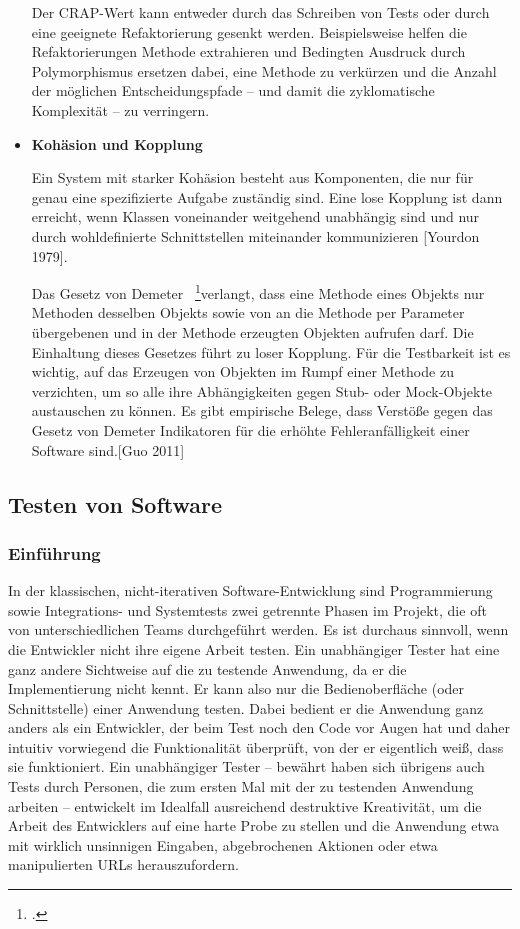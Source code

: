 \begin{itemize}
    Der CRAP-Wert kann entweder durch das Schreiben von Tests oder durch eine geeignete Refaktorierung 
    gesenkt werden. Beispielsweise helfen die Refaktorierungen Methode extrahieren und Bedingten Ausdruck 
    durch Polymorphismus ersetzen dabei, eine Methode zu verkürzen und die Anzahl der möglichen 
    Entscheidungspfade – und damit die zyklomatische Komplexität – zu verringern.
    
    \item \textbf{Kohäsion und Kopplung}
    
    Ein System mit starker Kohäsion besteht aus Komponenten, die nur für genau eine spezifizierte Aufgabe 
    zuständig sind. Eine lose Kopplung ist dann erreicht, wenn Klassen voneinander weitgehend unabhängig 
    sind und nur durch wohldefinierte Schnittstellen miteinander kommunizieren [Yourdon 1979].
    
    Das Gesetz von Demeter ~\footcite[Vgl. Seite 67-78]{Lieberherr.1989}verlangt, dass eine Methode eines Objekts nur Methoden desselben 
    Objekts sowie von an die Methode per Parameter übergebenen und     in der Methode erzeugten Objekten aufrufen darf. 
    Die Einhaltung dieses Gesetzes führt zu loser Kopplung. Für die Testbarkeit ist es wichtig, auf das Erzeugen von Objekten im
    Rumpf einer Methode zu verzichten, um so alle ihre Abhängigkeiten gegen Stub- oder
    Mock-Objekte austauschen zu können. Es gibt empirische Belege, dass Verstöße gegen
    das Gesetz von Demeter Indikatoren für die erhöhte Fehleranfälligkeit einer Software sind.[Guo 2011]
    
\end{itemize}

\subsection{Testen von Software}\label{arten-von-tests} 
\subsubsection{Einführung} %
In der klassischen, nicht-iterativen Software-Entwicklung sind Programmierung sowie
Integrations- und Systemtests zwei getrennte Phasen im Projekt, die oft von unterschiedlichen
Teams durchgeführt werden. Es ist durchaus sinnvoll, wenn die Entwickler nicht
ihre eigene Arbeit testen. Ein unabhängiger Tester hat eine ganz andere Sichtweise auf
die zu testende Anwendung, da er die Implementierung nicht kennt. Er kann also nur
die Bedienoberfläche (oder Schnittstelle) einer Anwendung testen. Dabei bedient er die
Anwendung ganz anders als ein Entwickler, der beim Test noch den Code vor Augen hat
und daher intuitiv vorwiegend die Funktionalität überprüft, von der er eigentlich weiß,
dass sie funktioniert. Ein unabhängiger Tester – bewährt haben sich übrigens auch Tests
durch Personen, die zum ersten Mal mit der zu testenden Anwendung arbeiten – entwickelt
im Idealfall ausreichend destruktive Kreativität, um die Arbeit des Entwicklers auf
eine harte Probe zu stellen und die Anwendung etwa mit wirklich unsinnigen Eingaben,
abgebrochenen Aktionen oder etwa manipulierten URLs herauszufordern.


